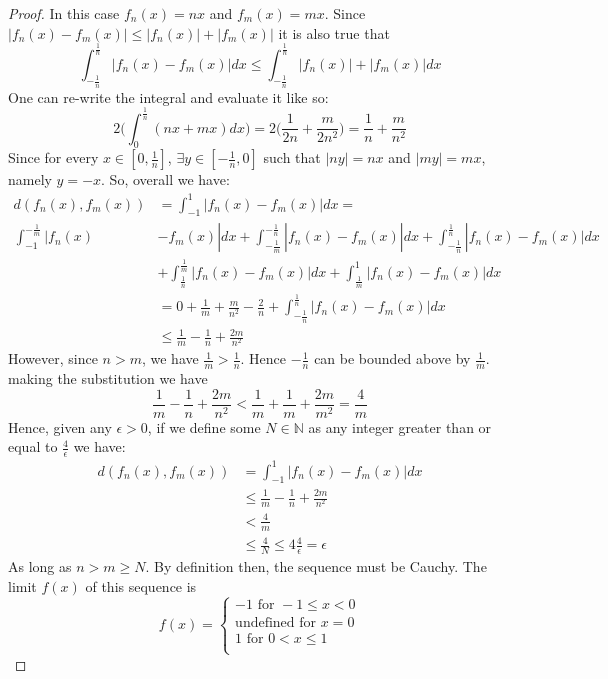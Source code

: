 \documentclass[12pt, letterpaper]{article}
\begin{document}
\begin{proof}
  \noindent In this case $f_n(x) = nx$ and $f_m(x) = mx$. Since $|f_n(x) - f_m(x)| \leq |f_n(x)| + |f_m(x)|$ it is also true that
  $$\int_{-\frac{1}{n}}^{\frac{1}{n}}|f_n(x) - f_m(x)|dx \leq \int_{-\frac{1}{n}}^{\frac{1}{n}}|f_n(x)| + |f_m(x)|dx$$
  One can re-write the integral and evaluate it like so:
  $$ 2\bigg(\int_{0}^{\frac{1}{n}} (nx + mx)dx \bigg) = 2\bigg(\frac{1}{2n} + \frac{m}{2n^2}\bigg) = \frac{1}{n} + \frac{m}{n^2}$$
  Since for every $x \in [0, \frac{1}{n}]$, $\exists y \in [-\frac{1}{n}, 0]$ such that $|ny| = nx$ and $|my| = mx$, namely $y = -x$. So, overall we have:
  \begin{align*}
    d(f_n(x), f_m(x)) &= \int_{-1}^{1}|f_n(x) - f_m(x)|dx = \\
     \int_{-1}^{-\frac{1}{m}}|f_n(x) &- f_m(x)|dx + \int_{-\frac{1}{m}}^{-\frac{1}{n}}|f_n(x) - f_m(x)|dx + \int_{-\frac{1}{n}}^{\frac{1}{n}}|f_n(x) - f_m(x)|dx  \\
    &+ \int_{\frac{1}{n}}^{\frac{1}{m}}|f_n(x) - f_m(x)|dx + \int_{\frac{1}{m}}^{1}|f_n(x) - f_m(x)|dx \\
    & = 0 + \frac{1}{m} + \frac{m}{n^2} - \frac{2}{n} + \int_{-\frac{1}{n}}^{\frac{1}{n}}|f_n(x) - f_m(x)|dx \\
    & \leq \frac{1}{m} - \frac{1}{n} + \frac{2m}{n^2}
  \end{align*}
  However, since $n > m$, we have $\frac{1}{m} > \frac{1}{n}$. Hence $-\frac{1}{n}$ can be bounded above by $\frac{1}{m}$. making the substitution we have
  $$ \frac{1}{m} - \frac{1}{n} + \frac{2m}{n^2} < \frac{1}{m} + \frac{1}{m} + \frac{2m}{m^2} = \frac{4}{m}$$
  Hence, given any $\epsilon > 0$, if we define some $N \in \mathbb{N}$ as any integer greater than or equal to $\frac{4}{\epsilon}$ we have:
  \begin{align*}
    d(f_n(x), f_m(x)) &= \int_{-1}^{1}|f_n(x) - f_m(x)|dx \\
    &\leq \frac{1}{m} - \frac{1}{n} + \frac{2m}{n^2}\\
    &< \frac{4}{m}\\
    &\leq \frac{4}{N} \leq{4}{\frac{4}{\epsilon}} = \epsilon
  \end{align*}
  As long as $n > m \geq N$. By definition then, the sequence must be Cauchy. The limit $f(x)$ of this sequence is
  \[
  f(x)=
   \begin{cases} -1  \text{ for } -1 \leq x < 0 \\
  \text{undefined for } x = 0 \\
   1   \text{ for } 0 < x \leq 1 \\
    \end{cases}
  \]

\end{proof}
\end{document}
